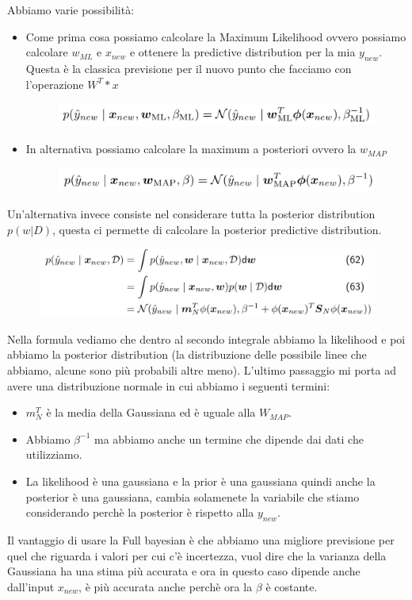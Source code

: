\documentclass[14pt]{extreport}
\begin{document}
Abbiamo varie possibilità:
\begin{itemize}
	\item Come prima cosa possiamo calcolare la Maximum Likelihood ovvero possiamo calcolare $w_{ML}$ e $x_{new}$ e ottenere la predictive
	      distribution per la mia $y_{new}$. Questa è la classica previsione per il nuovo punto che facciamo con l'operazione $W^T*x$
	      \begin{figure}[H]
		      \centering
		      \includegraphics[width=0.7\linewidth]{136.jpeg}
	      \end{figure}
	\item In alternativa possiamo calcolare la maximum a posteriori ovvero la $w_{MAP}$ \begin{figure}[H]
		      \centering
		      \includegraphics[width=0.7\linewidth]{137.jpeg}
	      \end{figure}
\end{itemize}

Un'alternativa invece consiste nel considerare tutta la posterior distribution $p(w|D)$, questa ci permette di calcolare la posterior predictive
distribution.

\begin{figure}[H]
	\centering
	\includegraphics[width=0.7\linewidth]{138.jpeg}
\end{figure}
Nella formula vediamo che dentro al secondo integrale abbiamo la likelihood e poi abbiamo la posterior distribution (la distribuzione delle possibile
linee che abbiamo, alcune sono più probabili altre meno). L'ultimo passaggio mi porta ad avere una distribuzione normale in cui abbiamo i seguenti
termini:
\begin{itemize}
	\item $m^T_N$ è la media della Gaussiana ed è uguale alla $W_{MAP}$.
	\item Abbiamo $\beta^{-1}$ ma abbiamo anche un termine che dipende dai dati che utilizziamo.
	\item La likelihood è una gaussiana e la prior è una gaussiana quindi anche la posterior è una gaussiana, cambia solamenete la variabile che
	      stiamo considerando perchè la posterior è rispetto alla $y_{new}$.
\end{itemize}
Il vantaggio di usare la Full bayesian è che abbiamo una migliore previsione per quel che riguarda i valori per cui c'è incertezza, vuol dire che la
varianza della Gaussiana ha una stima più accurata e ora in questo caso dipende anche dall'input $x_{new}$, è più accurata anche perchè ora la $\beta$
è costante.
\end{document}

